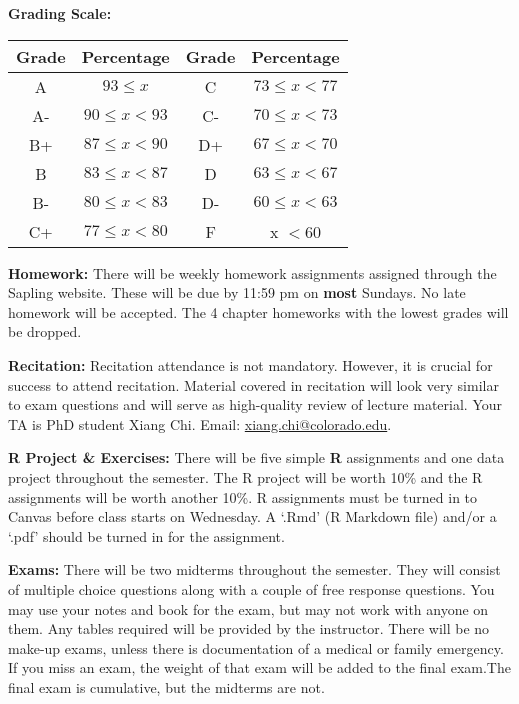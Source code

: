 \documentclass[12pt]{article}
\begin{document}
\vspace{5mm}\noindent 
\textbf{Grading Scale:}
\begin{center}
	\footnotesize{
		\begin{tabular}{|c|c|c|c|}
			\hline
			\textbf{Grade} & \textbf{Percentage} & \textbf{Grade} & \textbf{Percentage}       \\ \hline
			A  & $93 \leq x$      & C  & $73 \leq x < 77$ \\ \hline
			A- & $90 \leq x < 93$ & C- & $70 \leq x < 73$ \\ \hline
			B+ & $87 \leq x < 90$ & D+ & $67 \leq x < 70$ \\ \hline
			B  & $83 \leq x < 87$ & D  & $63 \leq x < 67$ \\ \hline
			B- & $80 \leq x < 83$ & D- & $60 \leq x < 63$ \\ \hline
			C+ & $77 \leq x < 80$ & F  & x $< 60$         \\ \hline
		\end{tabular}}
\end{center}


\vspace{5mm}\noindent 
\textbf{Homework:}
There will be weekly homework assignments assigned through the Sapling website. These will be due by 11:59 pm on \textbf{most} Sundays. %
No late homework will be accepted. The 4 chapter homeworks with the lowest grades will be dropped. 
 
\vspace{5mm}\noindent 
\textbf{Recitation:} Recitation attendance is not mandatory. However, it is crucial for success to attend recitation. Material covered in recitation will look very similar to exam questions and will serve as high-quality review of lecture material. Your TA is PhD student Xiang Chi. Email: \href{mailto:xiang.chi@colorado.edu}{xiang.chi@colorado.edu}.
 
\vspace{5mm}\noindent 
\textbf{R Project \& Exercises:} There will be five simple \textbf{R} assignments and one data project throughout the semester. The R project will be worth 10\% and the R assignments will be worth another 10\%. R assignments must be turned in to Canvas before class starts on Wednesday. A `.Rmd' (R Markdown file) and/or a `.pdf' should be turned in for the assignment. 
 
\vspace{5mm}\noindent
\textbf{Exams:}
There will be two midterms throughout the semester. They will consist of multiple choice questions along with a couple of free response questions. You may use your notes and book for the exam, but may not work with anyone on them. Any tables required will be provided by the instructor. There will be no make-up exams, unless there is documentation of a medical or family emergency. If you miss an exam, the weight of that exam will be added to the final exam.The final exam is cumulative, but the midterms are not.
\end{document}

